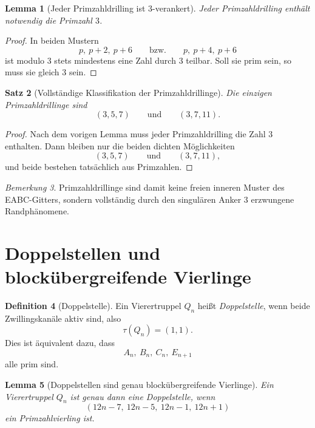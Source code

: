 \documentclass[11pt,a4paper]{article}
\newtheorem{satz}{Satz}
\newtheorem{lemma}[satz]{Lemma}
\theoremstyle{definition}
\newtheorem{definition}[satz]{Definition}
\theoremstyle{remark}
\newtheorem{bemerkung}[satz]{Bemerkung}
\begin{document}
	\begin{lemma}[Jeder Primzahldrilling ist \(3\)-verankert]
		Jeder Primzahldrilling enthält notwendig die Primzahl \(3\).
	\end{lemma}
	
	\begin{proof}
		In beiden Mustern
		\[
		p,\ p+2,\ p+6
		\qquad\text{bzw.}\qquad
		p,\ p+4,\ p+6
		\]
		ist modulo \(3\) stets mindestens eine Zahl durch \(3\) teilbar. Soll sie prim sein, so muss sie
		gleich \(3\) sein.
	\end{proof}
	
	\begin{satz}[Vollständige Klassifikation der Primzahldrillinge]
		Die einzigen Primzahldrillinge sind
		\[
		(3,5,7)
		\qquad\text{und}\qquad
		(3,7,11).
		\]
	\end{satz}
	
	\begin{proof}
		Nach dem vorigen Lemma muss jeder Primzahldrilling die Zahl \(3\) enthalten. Dann bleiben nur die
		beiden dichten Möglichkeiten
		\[
		(3,5,7)
		\qquad\text{und}\qquad
		(3,7,11),
		\]
		und beide bestehen tatsächlich aus Primzahlen.
	\end{proof}
	
	\begin{bemerkung}
		Primzahldrillinge sind damit keine freien inneren Muster des EABC-Gitters, sondern vollständig
		durch den singulären Anker \(3\) erzwungene Randphänomene.
	\end{bemerkung}
	
	\section{Doppelstellen und blockübergreifende Vierlinge}
	
	\begin{definition}[Doppelstelle]
		Ein Vierertruppel \(Q_n\) heißt \emph{Doppelstelle}, wenn beide Zwillingskanäle aktiv sind, also
		\[
		\tau(Q_n)=(1,1).
		\]
		Dies ist äquivalent dazu, dass
		\[
		A_n,\ B_n,\ C_n,\ E_{n+1}
		\]
		alle prim sind.
	\end{definition}
	
	\begin{lemma}[Doppelstellen sind genau blockübergreifende Vierlinge]
		Ein Vierertruppel \(Q_n\) ist genau dann eine Doppelstelle, wenn
		\[
		(12n-7,\ 12n-5,\ 12n-1,\ 12n+1)
		\]
		ein Primzahlvierling ist.
	\end{lemma}
	
\end{document}
